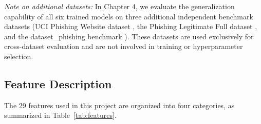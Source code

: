 \textit{Note on additional datasets:} In Chapter 4, we evaluate the generalization capability of all six trained models on three additional independent benchmark datasets (UCI Phishing Website dataset \cite{uci_phishing}, the Phishing Legitimate Full dataset \cite{phishing_leg}, and the dataset\_phishing benchmark \cite{ds_phishing}). These datasets are used exclusively for cross-dataset evaluation and are not involved in training or hyperparameter selection.

\subsection{Feature Description}
\label{subsec:features}

The 29 features used in this project are organized into four categories, as summarized in Table~\ref{tab:features}.


